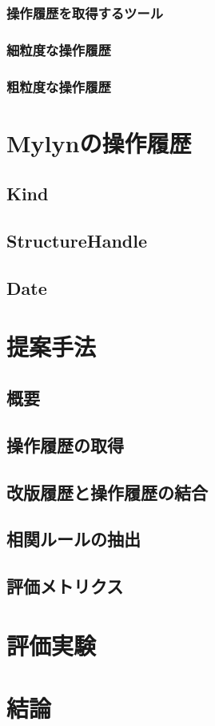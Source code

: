 \documentclass[a4paper]{jsbook}
\begin{document}
\subsection{操作履歴を取得するツール}
\subsection{細粒度な操作履歴}
\subsection{粗粒度な操作履歴}
\chapter{Mylynの操作履歴}
\section{Kind}
\section{StructureHandle}
\section{Date}
\chapter{提案手法}
\section{概要}
\section{操作履歴の取得}
\section{改版履歴と操作履歴の結合}
\section{相関ルールの抽出}
\section{評価メトリクス}
\chapter{評価実験}
\chapter{結論}

\appendix

\backmatter


\end{document}
